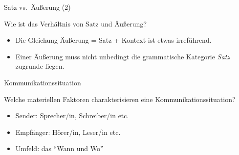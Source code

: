\begin{frame}{Satz vs.\ Äußerung (2)}
  
 Wie ist das Verhältnis von Satz und Äußerung?

\begin{itemize}[<+->]
\item Die Gleichung \alert{Äußerung = Satz + Kontext} ist etwas irreführend.
\item Einer Äußerung muss nicht unbedingt die grammatische Kategorie \textit{Satz} zugrunde liegen.
\end{itemize}


\end{frame}





\begin{frame}{Kommunikationssituation}
  
Welche materiellen Faktoren charakterisieren eine Kommunikationssituation?


\begin{itemize}
\item \alert{Sender}: Sprecher/in, Schreiber/in etc.
\item \alert{Empfänger}: Hörer/in, Leser/in etc.
\item \alert{Umfeld:} das "`Wann und Wo"'
\end{itemize}
\end{frame}



